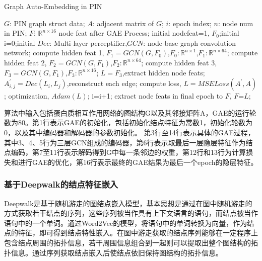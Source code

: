\begin{algorithm}[h]
    \caption{Graph Auto-Embedding in PIN} %
    \label{alg::gae}
    \begin{algorithmic}[1]
        \Require
        $G$: PIN graph struct data;
        $A$: adjacent matrix of $G$;
        $i$: epoch index;
        $n$: node num in PIN;
        \Ensure
        $F$: $\mathbb{R}^{n\times 16}$ node feat after GAE Process;
        \State initial nodefeat=1, $F_0$;initial i=0;initial $Dec$: Multi-layer perceptifier,$GCN$: node-base graph convolution network;
        \Repeat
        \State compute hidden feat 1, $F_1=GCN(G,F_0)$,$F_0:\mathbb{R}^{n\times 1}$,$F_1:\mathbb{R}^{n\times 64}$;
        \State compute hidden feat 2, $F_2=GCN(G,F_1)$,$F_2:\mathbb{R}^{n\times 64}$;
        \State compute hidden feat 3, $F_3=GCN(G,F_1)$,$F_3:\mathbb{R}^{n\times 16}$;
        \State $L=F_3$,extract hidden node feats;
        \State $A_{i,j}^{\prime}=Dec(L_i,L_j)$,reconstruct each edge;
        \EndFor
        \EndFor
        \State compute loss, $L=MSELoss(A^{\prime},A)$;
        \State optimization, $Adam(L)$;
        \State i=i+1;
        \State extract node feats in final epoch to $F$, $F$=$L$;
    \end{algorithmic}
\end{algorithm}
算法中输入包括蛋白质相互作用网络的图结构G以及其邻接矩阵A，GAE的运行轮数为80。第1行表示GAE的初始化，包括初始化结点特征为常数1，初始化轮数为0，以及其中编码器和解码器的参数初始化。
第3行至14行表示具体的GAE过程，其中3、4、5行为三层GCN组成的编码器，第6行表示取最后一层隐层特征作为结点编码，第7至11行表示解码得到G中每一条邻边的权重，第12行和13行为计算损失和进行GAE的优化，第16行表示最终的GAE结果为最后一个epoch的隐层特征。


\subsubsection{基于Deepwalk的结点特征嵌入}

Deepwalk是基于随机游走的图结点嵌入模型\cite{perozzi_deepwalk_2014}，基本思想是通过在图中随机游走的方式获取若干结点的序列，这些序列被当作具有上下文语言的语句，而结点被当作语句中的一个单词。通过Word2Vec的模型，将语句中的单词转换为向量，作为结点的特征，即可得到结点特性嵌入。在图中游走获取的结点序列能够在一定程序上包含结点周围的拓扑信息，若干周围信息组合到一起则可以提取出整个图结构的拓扑信息。通过序列获取结点嵌入后使结点依旧保持图结构的拓扑信息。

